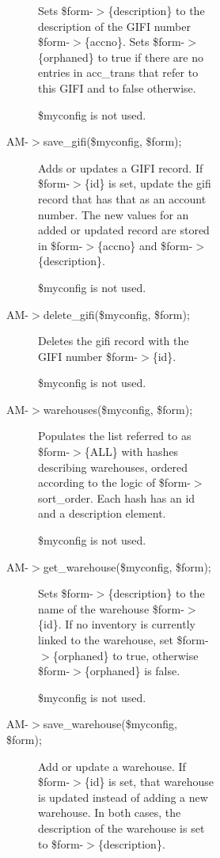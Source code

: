 \begin{description}
\begin{description}
\begin{description}
\begin{description}
\begin{description}
\begin{description}
\begin{description}
Sets \$form-$>$\{description\} to the description of the GIFI number \$form-$>$\{accno\}.
Sets \$form-$>$\{orphaned\} to true if there are no entries in acc\_trans that refer
to this GIFI and to false otherwise.



\$myconfig is not used.


\item[{AM-$>$save\_gifi(\$myconfig, \$form);}] \mbox{}

Adds or updates a GIFI record.  If \$form-$>$\{id\} is set, update the gifi record
that has that as an account number.  The new values for an added or updated
record are stored in \$form-$>$\{accno\} and \$form-$>$\{description\}.



\$myconfig is not used.


\item[{AM-$>$delete\_gifi(\$myconfig, \$form);}] \mbox{}

Deletes the gifi record with the GIFI number \$form-$>$\{id\}.



\$myconfig is not used.


\item[{AM-$>$warehouses(\$myconfig, \$form);}] \mbox{}

Populates the list referred to as \$form-$>$\{ALL\} with hashes describing
warehouses, ordered according to the logic of \$form-$>$sort\_order.  Each hash has
an id and a description element.



\$myconfig is not used.


\item[{AM-$>$get\_warehouse(\$myconfig, \$form);}] \mbox{}

Sets \$form-$>$\{description\} to the name of the warehouse \$form-$>$\{id\}.  If no
inventory is currently linked to the warehouse, set \$form-$>$\{orphaned\} to true,
otherwise \$form-$>$\{orphaned\} is false.



\$myconfig is not used.


\item[{AM-$>$save\_warehouse(\$myconfig, \$form);}] \mbox{}

Add or update a warehouse.  If \$form-$>$\{id\} is set, that warehouse is updated
instead of adding a new warehouse.  In both cases, the description of the
warehouse is set to \$form-$>$\{description\}.




\end{description}
\end{description}
\end{description}
\end{description}
\end{description}
\end{description}
\end{description}
